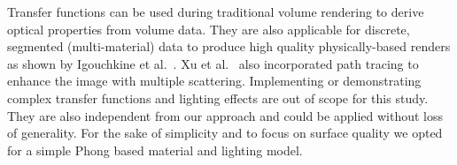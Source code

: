 \documentclass[journal]{vgtc}                     %
\begin{document}
Transfer functions can be used during traditional volume rendering to derive optical properties from volume data. They are also applicable for discrete, segmented (multi-material) data to produce high quality physically-based renders as shown by Igouchkine et al.~\cite{igouchkine2018multi}. Xu et al.~\cite{xu2025efficient} also incorporated path tracing to enhance the image with multiple scattering. Implementing or demonstrating complex transfer functions and lighting effects are out of scope for this study. They are also independent from our approach and could be applied without loss of generality. For the sake of simplicity and to focus on surface quality we opted for a simple Phong based material and lighting model.






\end{document}
